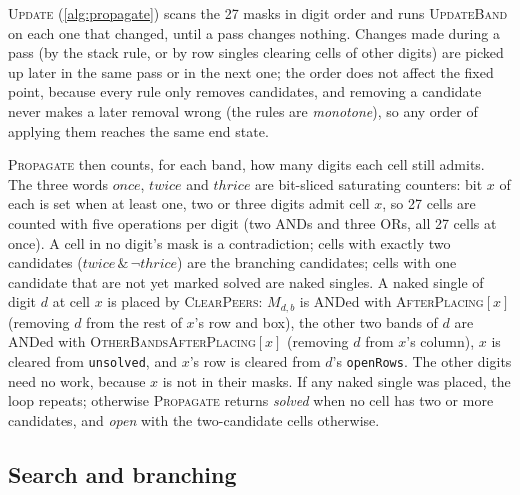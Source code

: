 \documentclass[11pt]{article}
\theoremstyle{definition}
\theoremstyle{plain}
\let\origtextsc\textsc
\renewcommand{\textsc}[1]{\textup{\origtextsc{#1}}}
\begin{document}
\textsc{Update} (\cref{alg:propagate}) scans the 27 masks in digit order and runs \textsc{UpdateBand} on each one that
changed, until a pass changes nothing. Changes made during a pass (by the stack rule, or by row singles clearing cells
of other digits) are picked up later in the same pass or in the next one; the order does not affect the fixed point,
because every rule only removes candidates, and removing a candidate never makes a later removal wrong
(the rules are \emph{monotone}), so any order of applying them reaches the same end state.

\textsc{Propagate} then counts, for each band, how many digits each cell still admits. The three words
$\mathit{once}$, $\mathit{twice}$ and $\mathit{thrice}$ are bit-sliced saturating counters: bit $x$ of each is set when at least one, two or three digits admit cell $x$, so
27 cells are counted with five operations per digit (two ANDs and three ORs, all 27 cells at once). A cell in no digit's mask is a contradiction; cells with exactly
two candidates ($\mathit{twice}\,\&\,\lnot \mathit{thrice}$) are the branching candidates; cells with one candidate that are not yet marked
solved are naked singles. A naked single of digit $d$ at cell $x$ is placed by \textsc{ClearPeers}: $M_{d,b}$ is ANDed
with \textsc{AfterPlacing}$[x]$ (removing $d$ from the rest of $x$'s row and box), the other two bands of $d$ are ANDed
with \textsc{OtherBandsAfterPlacing}$[x]$ (removing $d$ from $x$'s column), $x$ is cleared from \texttt{unsolved}, and $x$'s row
is cleared from $d$'s \texttt{openRows}. The other digits need no work, because $x$ is not in their masks. If any
naked single was placed, the loop repeats; otherwise \textsc{Propagate} returns \emph{solved} when no cell has two or
more candidates, and \emph{open} with the two-candidate cells otherwise.

\subsection{Search and branching}
\end{document}
